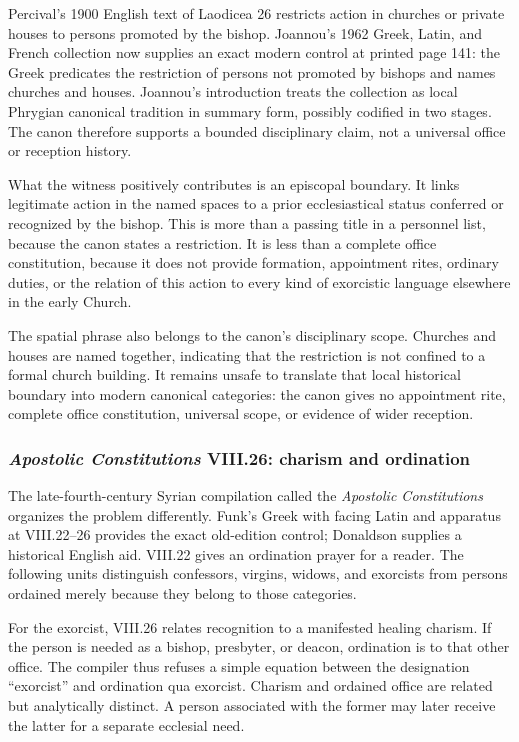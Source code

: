 Percival's 1900 English text of Laodicea 26 restricts action in churches or
private houses to persons promoted by the bishop. Joannou's 1962 Greek,
Latin, and French collection now supplies an exact modern control at printed
page 141: the Greek predicates the restriction of persons not promoted by
bishops and names churches and houses. Joannou's introduction treats the
collection as local Phrygian canonical tradition in summary form, possibly
codified in two stages. The canon therefore supports a bounded disciplinary
claim, not a universal office or reception history.

What the witness positively contributes is an episcopal boundary. It links
legitimate action in the named spaces to a prior ecclesiastical status
conferred or recognized by the bishop. This is more than a passing title in a
personnel list, because the canon states a restriction. It is less than a
complete office constitution, because it does not provide formation,
appointment rites, ordinary duties, or the relation of this action to every
kind of exorcistic language elsewhere in the early Church.

The spatial phrase also belongs to the canon's disciplinary scope. Churches
and houses are named together, indicating that the restriction is not
confined to a formal church building. It remains unsafe to translate that
local historical boundary into modern canonical categories: the canon gives
no appointment rite, complete office constitution, universal scope, or
evidence of wider reception.

\subsubsection{\emph{Apostolic Constitutions} VIII.26: charism and ordination}

The late-fourth-century Syrian compilation called the
\emph{Apostolic Constitutions} organizes the problem differently. Funk's
Greek with facing Latin and apparatus at VIII.22--26 provides the exact
old-edition control; Donaldson supplies a historical English aid. VIII.22
gives an ordination prayer for a reader. The following units distinguish
confessors, virgins, widows, and exorcists from persons ordained merely
because they belong to those categories.

For the exorcist, VIII.26 relates recognition to a manifested healing charism.
If the person is needed as a bishop, presbyter, or deacon, ordination is to
that other office. The compiler thus refuses a simple equation between the
designation ``exorcist'' and ordination qua exorcist. Charism and ordained
office are related but analytically distinct. A person associated with the
former may later receive the latter for a separate ecclesial need.

